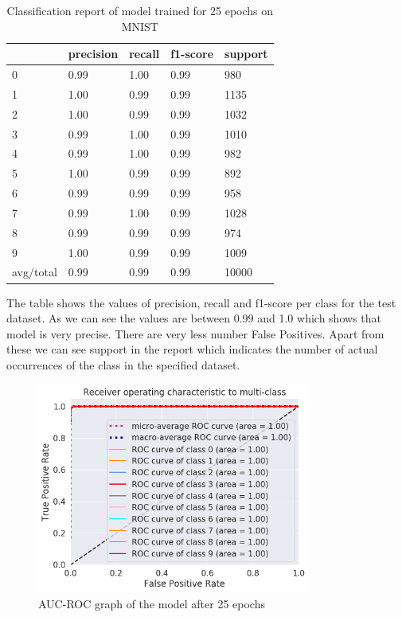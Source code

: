  \begin{table}[h]
\centering
\begin{tabular}{|l|l|l|l|l|}
\hline
          & precision & recall & f1-score & support \\ \hline
0         & 0.99      & 1.00   & 0.99     & 980     \\ \hline
1         & 1.00      & 0.99   & 0.99     & 1135    \\ \hline
2         & 1.00      & 0.99   & 0.99     & 1032    \\ \hline
3         & 0.99      & 1.00   & 0.99     & 1010    \\ \hline
4         & 0.99      & 1.00   & 0.99     & 982     \\ \hline
5         & 1.00      & 0.99   & 0.99     & 892     \\ \hline
6         & 0.99      & 0.99   & 0.99     & 958     \\ \hline
7         & 0.99      & 1.00   & 0.99     & 1028    \\ \hline
8         & 0.99      & 0.99   & 0.99     & 974     \\ \hline
9         & 1.00      & 0.99   & 0.99     & 1009    \\ \hline
avg/total & 0.99      & 0.99   & 0.99     & 10000   \\ \hline
\end{tabular}
\caption{Classification report of model trained for 25 epochs on MNIST}
\end{table}
\noindent The table shows the values of precision, recall and f1-score per class for the test dataset. As we can see the values are between 0.99 and 1.0 which shows that model is very precise. There are very less number False Positives. Apart from these we can see support in the report which indicates the number of actual occurrences of the class in the specified dataset. 
\begin{figure}[h]
    \centering
    \includegraphics[width=0.8\textwidth]{thesis_template/images/roc.png}
    \caption{\small AUC-ROC graph of the model after 25 epochs}
    \label{}
    \end{figure}
    

